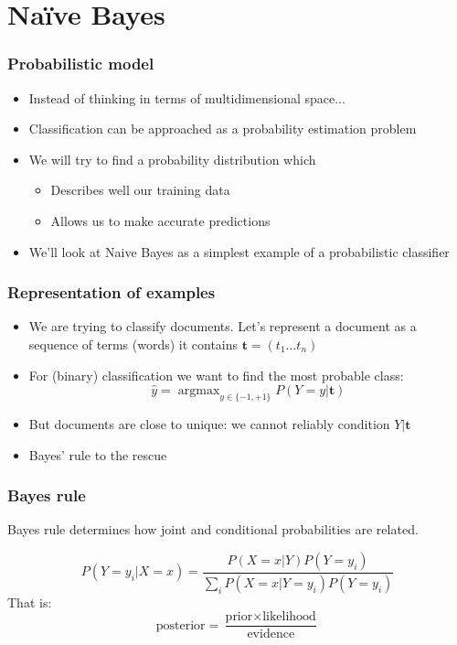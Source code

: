 \documentclass[14pt,mathserif]{beamer}
\DeclareMathOperator*{\argmax}{argmax}
\begin{document}
\section{Na{\"i}ve Bayes}
\begin{frame}
  \frametitle{Probabilistic model}
  \begin{itemize}
  \item Instead of thinking in terms of multidimensional space...
  \item Classification can be approached as a probability estimation problem
  \item We will try to find a probability distribution which
    \begin{itemize}
    \item  Describes
    well our training data 
  \item Allows us  to make accurate predictions 
    \end{itemize}
  \item We'll look at Naive Bayes as a simplest example of a
    probabilistic classifier
  \end{itemize}
\end{frame}


\begin{frame}
  \frametitle{Representation of examples}
  \begin{itemize}
    \item We are trying to classify documents. Let's
    represent a document as a sequence of terms (words) it contains
    $\mathbf{t} = (t_1...t_n)$

  \item For (binary) classification we want to find the most probable class:
    \[ \hat{y} = \argmax_{y \in \{-1,+1\}} P(Y=y|\mathbf{t}) \]
  \item But documents are close to unique: we cannot reliably
    condition $Y|\mathbf{t}$
  \item Bayes' rule to the rescue
  \end{itemize}
\end{frame}


\begin{frame}
  \frametitle{Bayes rule} Bayes rule determines how joint and
  conditional probabilities are related.
 
  \begin{block}{}
\[
P(Y=y_i|X=x) = \frac{P(X=x|Y) P(Y=y_i)}{\sum_i P(X=x|Y=y_i)
  P(Y=y_i)}
\]
That is:
\[
\mbox{posterior} = \frac{\mbox{prior} \times
  \mbox{likelihood}}{\mbox{evidence}}
\]
\end{block}
\end{frame}
\end{document}
